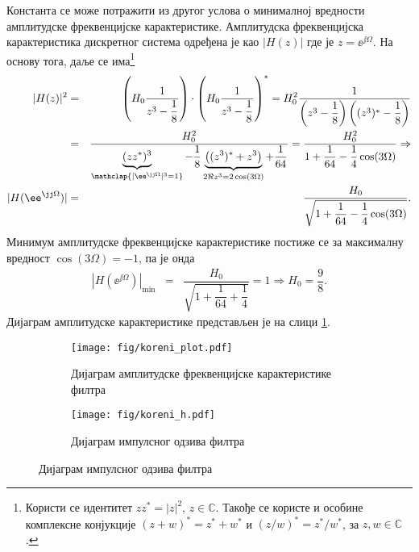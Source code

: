 Константа се може потражити из другог услова о минималној вредности амплитудске фреквенцијске карактеристике.
Амплитудска фреквенцијска карактеристика дискретног система одређена је као $|H(z)|$ где је 
$ z = \ee^{\jj\Omega}$. На основу тога, даље се има\footnote{
    Користи се идентитет $z z^{\ast} = |z|^2$, $z \in \mathbb C$. Такође се користе и особине комплексне конјукције
    $(z + w)^* = z^* + w^*$ и $(z/w)^* = z^*/w^*$, за $z,w\in\mathbb C$.
}
\begin{eqnarray*}
    |H(z)|^2 &=& \left( H_0 \dfrac{1}{z^3 - \dfrac{1}{8}} \right) \cdot  \left( H_0 \dfrac{1}{z^3 - \dfrac{1}{8}} \right)^*
              =  H_0^2 \dfrac{1}{ \left(z^3 - \dfrac{1}{8}\right)\left((z^3)^* - \dfrac{1}{8}\right)  } 
            \\
             &=& \dfrac{H_0^2}{ \underbrace{(zz^*)^3}_{\mathclap{ |\ee^{\jj\Omega}|^3 = 1 }} - \dfrac{1}{8} 
             \underbrace{\left( (z^3)^* + z^3 \right)}_{2\Re{z^3} = 2\cos(3\Omega) } + \dfrac{1}{64} } 
             = 
             \dfrac{H_0^2}{ 1 + \dfrac{1}{64} - \dfrac{1}{4}\cos(3\Omega) } \Rightarrow \\
    |H(\ee^{\jj\Omega})| &=& \dfrac{H_0}{ \sqrt{ 1 + \dfrac{1}{64} - \dfrac{1}{4}\cos(3\Omega)} }.
\end{eqnarray*}
Минимум амплитудске фреквенцијске карактеристике постиже се за максималну вредност $\cos(3\Omega) = -1$, па је онда 
\begin{eqnarray}
    |H(\ee^{\jj\Omega})|_{\min} &=& \dfrac{H_0}{ \sqrt{ 1 + \dfrac{1}{64} + \dfrac{1}{4} } } = 1 
    \Rightarrow H_0 = \dfrac{9}{8}.
\end{eqnarray}
Дијаграм амплитудске карактеристике представљен је на слици \ref{\ID.fig.H}.
\begin{figure}[ht!]
    \centering
    \begin{subfigure}{0.49\textwidth}
        \texttt{[image: fig/koreni\_plot.pdf]}
        \caption{Дијаграм амплитудске фреквенцијске карактеристике филтра}
        \label{\ID.fig.H}    
    \end{subfigure}
    \begin{subfigure}{0.49\textwidth}
        \texttt{[image: fig/koreni\_h.pdf]}
        \caption{Дијаграм импулсног одзива филтра}
        \label{\ID.fig.himp}    
    \end{subfigure}
\end{figure}


